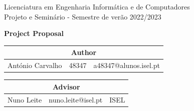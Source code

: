\documentclass[11pt,a4paper]{article}
\author{António Carvalho}
\begin{document}
\renewcommand{\baselinestretch}{1.2}



\begin{figure}[ht!]
	\vspace*{-2.9cm}
	\centering
\end{figure}

\vspace*{-1.5cm}

\begin{center}
Licenciatura em Engenharia Informática e de Computadores \\
Projeto e Seminário - Semestre de verão 2022/2023 \\
\end{center}

\begin{center}
{\large \textbf {Project Proposal}}
\end{center}	

\smallskip

\renewcommand{\arraystretch}{1.2}
 	\begin{center}
		\begin{tabular}{ p{3 cm} p{2 cm} p{3.6 cm}  }
			\multicolumn {3}{c}{ \large{\textbf{Author}}} \\
			\hline
			 António Carvalho & 48347 &  a48347@alunos.isel.pt \\
		\end{tabular}
	\end{center}

\smallskip


\renewcommand{\arraystretch}{1.2}
	\begin{center}
		\begin{tabular}{ p{3 cm} p{3.6 cm}  p{2cm} }
			\multicolumn{3}{c}{\large{\textbf{Advisor}}} \\
			\hline
			 Nuno Leite  &  nuno.leite@isel.pt & ISEL \\
		\end{tabular}
	\end{center}
\end{document}
